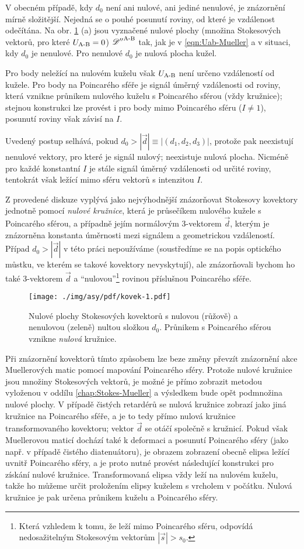 V obecném případě, kdy $d_0$ není ani nulové, ani jediné nenulové, je znázornění mírně složitější.
Nejedná se o pouhé posunutí roviny, od které je vzdálenost odečítána.
Na obr. \ref{fig:mustek-znazorneni-kovektoru} (a) jsou vyznačené nulové plochy (množina Stokesových vektorů, pro které $U_\textrm{A-B}=0$) ${\mathscr{D}''}^\textrm{A-B}$ tak, jak je v \eqref{eqn:Uab-Mueller} a v situaci, kdy $d_0$ je nenulové.
Pro nenulové $d_0$ je nulová plocha kužel.

Pro body neležící na nulovém kuželu však $U_\textrm{A-B}$ není určeno vzdáleností od kužele.
Pro body na Poincarého sféře je signál úměrný vzdálenosti od roviny, která vznikne průnikem nulového kuželu s Poincarého sférou (vždy kružnice); stejnou konstrukci lze provést i pro body mimo Poincarého sféru ($I\neq1$), posunutí roviny však závisí na $I$.

Uvedený postup selhává, pokud $d_0>|\vec{d}|\equiv|(d_1, d_2, d_3)|$, protože pak ne\-existují nenulové vektory, pro které je signál nulový; neexistuje nulová plocha.
Nicméně pro každé konstantní $I$ je stále signál úměrný vzdálenosti od určité roviny, tentokrát však ležící mimo sféru vektorů s intenzitou $I$.

Z provedené diskuze vyplývá jako nejvýhodnější znázorňovat Stokesovy kovektory jednotně pomocí \emph{nulové kružnice}, která je průsečíkem nulového kužele s Poincarého sférou, a případně jejím normálovým 3-vektorem $\vec{d}$, kterým je znázorněna konstanta úměrnosti mezi signálem a geometrickou vzdáleností.
Případ $d_0>|\vec{d}|$ v této práci nepoužíváme (soustředíme se na popis optického můstku, ve kterém se takové kovektory nevyskytují), ale znázorňovali bychom ho také 3-vektorem $\vec{d}$ a ``nulovou''\footnote{Která vzhledem k tomu, že leží mimo Poincarého sféru, odpovídá nedosažitelným Stokesovým vektorům $|\vec{s}|>s_0$.} rovinou příslušnou Poincarého sféře.

\begin{figure}[htbp]
    \centering
    \texttt{[image: ./img/asy/pdf/kovek-1.pdf]}
    \caption{Nulové plochy Stokesových kovektorů s nulovou (růžově) a nenulovou (zeleně) nultou složkou $d_0$. Průnikem s Poincarého sférou vznikne \emph{nulová} kružnice.}
    \label{fig:mustek-znazorneni-kovektoru}
\end{figure}

Při znázornění kovektorů tímto způsobem lze beze změny převzít znázornění akce Muellerových matic pomocí mapování Poincarého sféry.
Protože nulové kružnice jsou množiny Stokesových vektorů, je možné je přímo zobrazit metodou vyloženou v oddílu \ref{chap:Stokes-Mueller} a výsledkem bude opět podmnožina nulové plochy.
V případě čistých retardérů se nulová kružnice zobrazí jako jiná kružnice na Poincarého sféře, a je to tedy přímo nulová kružnice transformovaného kovektoru; vektor $\vec{d}$ se otáčí společně s kružnicí.
Pokud však Muellerovou maticí dochází také k deformaci a posunutí Poincarého sféry (jako např. v případě čistého diatenuátoru), je obrazem zobrazení obecně elipsa ležící uvnitř Poincarého sféry, a je proto nutné provést následující konstrukci pro získání nulové kružnice.
Transformovaná elipsa vždy leží na nulovém kuželu, takže ho můžeme určit proložením elipsy kuželem s vrcholem v počátku.
Nulová kružnice je pak určena průnikem kuželu a Poincarého sféry.
